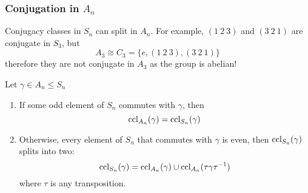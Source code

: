 \documentclass{article}
\begin{document}
\subsubsection*{Conjugation in $A_n$}
\begin{warning}
    Conjugacy classes in $S_n$ can split in $A_n$. 
    For example, $(1\ 2\ 3)$ and $(3\ 2\ 1)$ are conjugate in $S_3$, but
    \[
        A_3 \cong C_3 = \{e, (1\ 2\ 3), (3\ 2\ 1)\}
    \]
    therefore they are not conjugate in $A_3$ as the group is abelian!
\end{warning}
\begin{lemma}[$\ccl$'s in $A_n$]
    Let $\gamma \in A_n \leq S_n$
    \begin{enumerate}
        \item If some odd element of $S_n$ commutes with $\gamma$, then
        \[
            \operatorname{ccl}_{A_n}(\gamma) = \operatorname{ccl}_{S_n}(\gamma)    
        \]
        \item Otherwise, every element of $S_n$ that commutes with $\gamma$ is even, 
        then $\operatorname{ccl}_{S_n}(\gamma)$ splits into two:
        \[
            \operatorname{ccl}_{S_n}(\gamma) = \operatorname{ccl}_{A_n}(\gamma) \cup \operatorname{ccl}_{A_n}(\tau \gamma \tau^{-1})  
        \]
        where $\tau$ is any transposition.
    \end{enumerate}
\end{lemma}
\end{document}
